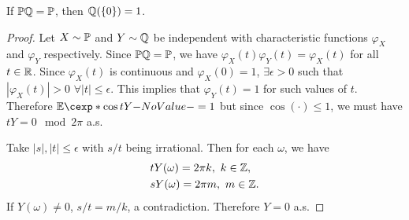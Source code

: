 \documentclass[12pt]{article}
\begin{document}
\begin{Lemma}\label{wk11:lem:Q0}
If $\P*\bbQ=\P$, then $\mathbb{Q}(\{0\})=1$.
\end{Lemma}
\begin{proof}
Let $X\sim\P$ and $Y\sim\mathbb{Q}$ be independent with characteristic functions $\varphi_X$ and $\varphi_Y$ respectively. Since $\P*\bbQ=\P$, we have $\varphi_X(t)\varphi_Y(t)=\varphi_X(t)$ for all $t\in\mathbb{R}$. Since $\varphi_X(t)$ is continuous and $\varphi_X(0)=1$, $\exists \epsilon>0$ such that $|\varphi_X(t)|>0$ $\forall |t| \leq \epsilon$. This implies that $\varphi_Y(t)=1$ for such values of $t$. Therefore $\E[\cos tY]=1$ but since $\cos(\cdot) \leq 1$, we must have $tY = 0 \mod 2\pi$ a.s. 

Take $|s|, |t|\leq \epsilon$ with $s/t$ being irrational. Then for each $\omega$, we have
\begin{align*}
& tY(\omega) = 2\pi k,\ k\in\mathbb{Z},\\
& sY(\omega) = 2\pi m,\ m\in\mathbb{Z}.
\end{align*}
If $Y(\omega) \ne 0$, $s/t = m/k$, a contradiction. Therefore $Y=0$ a.s.
\end{proof}
\end{document}
